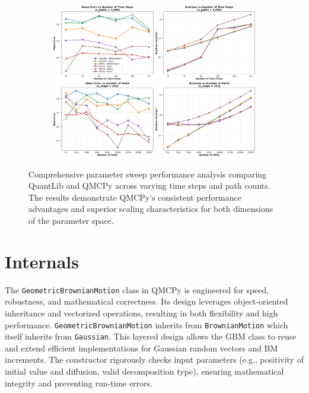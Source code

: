 \documentclass{article}
\begin{document}
\begin{figure}[H]
    \centering
    \begin{subfigure}{1\textwidth}
        \centering
        \includegraphics[width=\textwidth]{images/figure_7.png}
        \label{subfig:performance_steps2}
    \end{subfigure}

    \caption{Comprehensive parameter sweep performance analysis comparing QuantLib and QMCPy across varying time steps and path counts. The results demonstrate QMCPy's consistent performance advantages and superior scaling characteristics for both dimensions of the parameter space.}
    \label{fig:gbm_performance2}
\end{figure}

\section{Internals}

The \texttt{GeometricBrownianMotion} class in QMCPy is engineered for speed, robustness, and mathematical correctness. Its design leverages object-oriented inheritance and vectorized operations, resulting in both flexibility and high performance.
\texttt{GeometricBrownianMotion} inherits from \texttt{BrownianMotion} which itself inherits from \texttt{Gaussian}. This layered design allows the GBM class to reuse and extend efficient implementations for Gaussian random vectors and BM increments.
The constructor rigorously checks input parameters (e.g., positivity of initial value and diffusion, valid decomposition type), ensuring mathematical integrity and preventing run-time errors.
\end{document}
